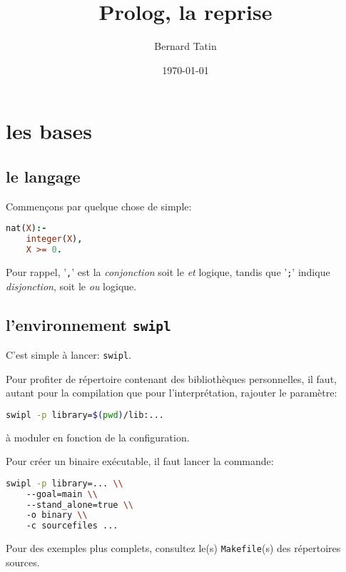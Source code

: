 \documentclass[a4paper,12pt]{book}
\title{Prolog, la reprise}
\author{Bernard Tatin}
\date{\today}
\begin{document}
\maketitle
\tableofcontents

\chapter{les bases}

\section{le langage}
Commençons par quelque chose de simple:

\begin{lstlisting}[language=Prolog, caption=définition de l'ensemble des entiers]
nat(X):-
	integer(X),
	X >= 0.
\end{lstlisting}

Pour rappel, '\texttt{,}' est la \textit{conjonction} soit le \textit{et} logique, tandis que '\texttt{;}' indique \textit{disjonction}, soit le \textit{ou} logique.

\section{l'environnement \texttt{swipl}}

C'est simple à lancer: \texttt{swipl}. 

Pour profiter de répertoire contenant des bibliothèques personnelles, il faut, autant pour la compilation que pour l'interprétation, rajouter le paramètre:
\begin{lstlisting}[language=sh, caption=swipl: démarrer avec le chemin des bibliothèques] 
swipl -p library=$(pwd)/lib:...
\end{lstlisting}
 
à moduler en fonction de la configuration.

Pour créer un binaire exécutable, il faut lancer la commande:
\begin{lstlisting}[language=sh, caption=swipl: créer un binaire exécutable]
swipl -p library=... \\
    --goal=main \\
    --stand_alone=true \\
    -o binary \\
    -c sourcefiles ...
\end{lstlisting}

Pour des exemples plus complets, con\-sul\-tez le(s) \texttt{Makefile}(s) des ré\-per\-toi\-res sour\-ces.
\end{document}
